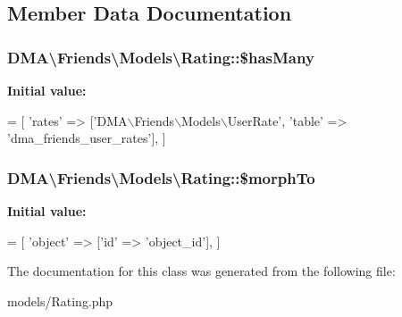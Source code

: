 \subsection{Member Data Documentation}
\hypertarget{classDMA_1_1Friends_1_1Models_1_1Rating_adc22040709ec725978418fe64ef1e23c}{}
\subsubsection[{\$has\+Many}]{\setlength{\rightskip}{0pt plus 5cm}D\+M\+A\textbackslash{}\+Friends\textbackslash{}\+Models\textbackslash{}\+Rating\+::\$has\+Many}\label{classDMA_1_1Friends_1_1Models_1_1Rating_adc22040709ec725978418fe64ef1e23c}
{\bfseries Initial value\+:}
\begin{DoxyCode}
= [
            \textcolor{stringliteral}{'rates'} => [\textcolor{stringliteral}{'DMA\(\backslash\)Friends\(\backslash\)Models\(\backslash\)UserRate'}, \textcolor{stringliteral}{'table'} => \textcolor{stringliteral}{'dma\_friends\_user\_rates'}],
    ]
\end{DoxyCode}
\hypertarget{classDMA_1_1Friends_1_1Models_1_1Rating_ac69646e8796da963eda8ff715ea52593}{}
\subsubsection[{\$morph\+To}]{\setlength{\rightskip}{0pt plus 5cm}D\+M\+A\textbackslash{}\+Friends\textbackslash{}\+Models\textbackslash{}\+Rating\+::\$morph\+To}\label{classDMA_1_1Friends_1_1Models_1_1Rating_ac69646e8796da963eda8ff715ea52593}
{\bfseries Initial value\+:}
\begin{DoxyCode}
= [
            \textcolor{stringliteral}{'object'} => [\textcolor{stringliteral}{'id'} => \textcolor{stringliteral}{'object\_id'}],
    ]
\end{DoxyCode}


The documentation for this class was generated from the following file\+:\begin{DoxyCompactItemize}
\item 
models/Rating.\+php\end{DoxyCompactItemize}

